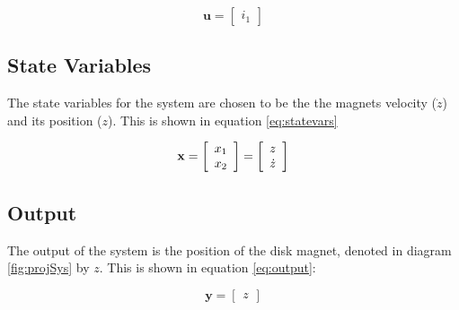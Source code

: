 \begin{equation}
	\label{eq:input}
	\textbf{u} = \left[\begin{array}{c}i_{1}\end{array}\right]
\end{equation}

\subsection{State Variables}
\label{sec:statevars}

The state variables for the system are chosen to be the the magnets velocity ($\dot{z}$) and its position ($z$). 
This is shown in equation \ref{eq:statevars}

\begin{equation}
	\label{eq:statevars}
	{\bf x} = 
	\left[
		\begin{array}{c}
			x_{1} \\
			x_{2} \\
		\end{array}
	\right]
	=
	\left[
		\begin{array}{c}
			z \\
			\dot{z} \\
		\end{array}
	\right]
\end{equation}

\subsection{Output}
The output of the system is the position of the disk magnet, denoted in diagram \ref{fig:projSys} by $z$.
This is shown in equation \ref{eq:output}:

\begin{equation}
	\label{eq:output}
	\textbf{y} = 
	\left[\begin{array}{c}z\end{array}\right] %
\end{equation}